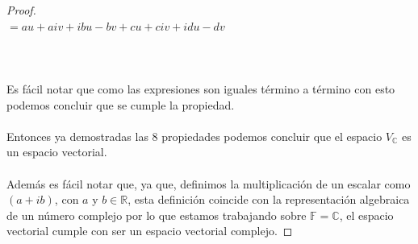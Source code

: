 \documentclass[11pt]{article}
\theoremstyle{definition} %
\begin{document}
\begin{proof}
\\

$= au + aiv + ibu -bv + cu + civ + idu - dv$\\

\\

\\

\\

Es fácil notar que como las expresiones son iguales término a término con esto podemos concluir que se cumple la propiedad.\\

\\

Entonces ya demostradas las 8 propiedades podemos concluir que el espacio $V_\mathbb{C}$ es un espacio vectorial.\\

\\

Además es fácil notar que, ya que, definimos la multiplicación de un escalar como $(a + ib)$, con $a$ y $b \in \mathbb{R}$, esta definición coincide con la representación algebraica de un número complejo por lo que estamos trabajando sobre $\mathbb{F} = \mathbb{C}$, el espacio vectorial cumple con ser un espacio vectorial complejo.
  
\end{proof}
\end{document}
